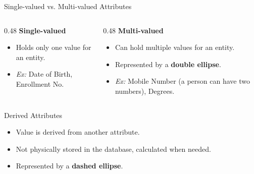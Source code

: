 \documentclass[aspectratio=169, xcolor=dvipsnames]{beamer}
\begin{document}
\begin{frame}{Single-valued vs. Multi-valued Attributes}
    \begin{columns}[t]
        \begin{column}{0.48\textwidth}
            \textbf{Single-valued}
            \begin{itemize}
                \item Holds only one value for an entity.
                \item \textit{Ex:} Date of Birth, Enrollment No.
            \end{itemize}
        \end{column}
        
        \begin{column}{0.48\textwidth}
            \textbf{Multi-valued}
            \begin{itemize}
                \item Can hold multiple values for an entity.
                \item Represented by a \textbf{double ellipse}.
                \item \textit{Ex:} Mobile Number (a person can have two numbers), Degrees.
            \end{itemize}
        \end{column}
    \end{columns}
    
    \vspace{1em}
    \centering
\end{frame}

\begin{frame}{Derived Attributes}
    \begin{itemize}
        \item Value is derived from another attribute.
        \item Not physically stored in the database, calculated when needed.
        \item Represented by a \textbf{dashed ellipse}.
    \end{itemize}
    
    \vspace{1em}
    \centering
\end{frame}
\end{document}
